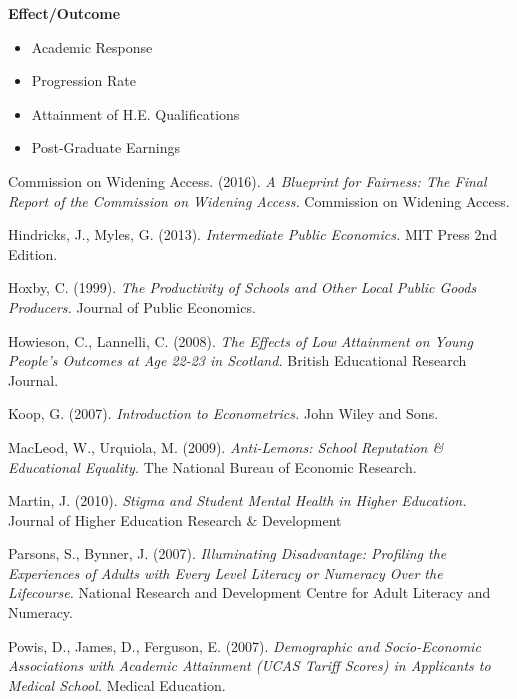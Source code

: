\documentclass[11pt, english]{article}
\begin{document}
	\textbf{Effect/Outcome}
        \begin{itemize}                               
        \setlength\itemsep{0cm}            
                \item Academic Response 
                \item Progression Rate
                \item Attainment of H.E. Qualifications
                \item Post-Graduate Earnings
        \end{itemize}

\newpage

	\renewcommand\refname{Bibliography}

        \begin{thebibliography}{9}

		Commission on Widening Access. (2016).
		\textsl{A Blueprint for Fairness: The Final Report of the Commission on Widening Access.}
		Commission on Widening Access.

		Hindricks, J., Myles, G. (2013).
		\textsl{Intermediate Public Economics.}
		MIT Press 2nd Edition.
	
		Hoxby, C. (1999).
		\textsl{The Productivity of Schools and Other Local Public Goods Producers.}
		Journal of Public Economics.

		Howieson, C., Lannelli, C. (2008).
		\textsl{The Effects of Low Attainment on Young People’s Outcomes at Age 22-23 in Scotland.}
		British Educational Research Journal.

		Koop, G. (2007).
		\textsl{Introduction to Econometrics.}
		John Wiley and Sons.

		MacLeod, W., Urquiola, M. (2009).
		\textsl{Anti-Lemons: School Reputation \& Educational Equality.}
		The National Bureau of Economic Research.

		Martin, J. (2010).
		\textsl{Stigma and Student Mental Health in Higher Education.}
		Journal of Higher Education Research \& Development

		Parsons, S., Bynner, J. (2007).
		\textsl{Illuminating Disadvantage: Profiling the Experiences of Adults with Every Level Literacy or Numeracy Over the Lifecourse.}
		National Research and Development Centre for Adult Literacy and Numeracy.

		Powis, D., James, D., Ferguson, E. (2007).
		\textsl{Demographic and Socio-Economic Associations with Academic Attainment (UCAS Tariff Scores) in Applicants to Medical School.}
		Medical Education.


\end{thebibliography}
\end{document}
